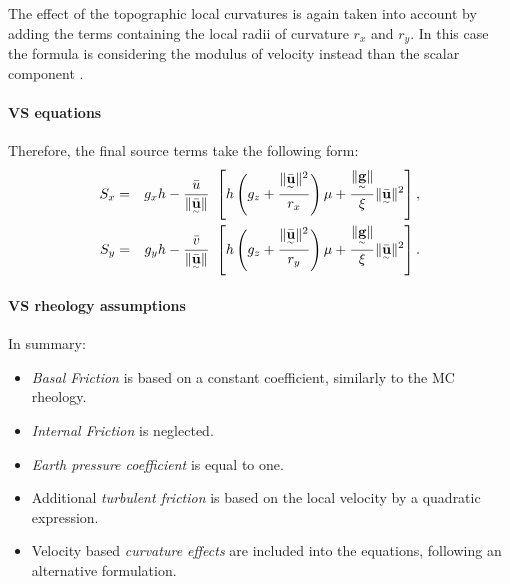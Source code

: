 \documentclass{article}
\begin{document}
The effect of the topographic local curvatures is again taken into account by adding the terms containing the local radii of curvature $r_x$ and $r_y$. In this case the formula is considering the modulus of velocity instead than the scalar component \citep{Fischer2012}.

\paragraph{VS equations} Therefore, the final source terms take the following form:
\begin{eqnarray}
\label{eq:S_terms_VS}
S_{x} &=&  g_{x} h - \frac{\bar{u}}{\| \underset{^\sim}{\bar{\textbf u}}\|} \ \left[ h \left(g_{z} + \frac{\| \underset{^\sim}{\bar{\textbf u}} \|^2}{r_{x}} \right)\mu+ \frac{\| \underset{^\sim}{\textbf g} \|}{\xi}\| \underset{^\sim}{\bar{\textbf u}} \|^2\right], \nonumber \\
S_{y} &=& g_{y} h - \frac{\bar{v}}{\| \underset{^\sim}{\bar{\textbf u}}\|} \ \left[ h \left(g_{z} + \frac{\| \underset{^\sim}{\bar{\textbf u}} \|^2}{r_{y}} \right)\mu+ \frac{\| \underset{^\sim}{\textbf g} \|}{\xi}\| \underset{^\sim}{\bar{\textbf u}} \|^2\right].
\end{eqnarray}

\paragraph{VS rheology assumptions} In summary:
\begin{itemize}
\item \textit{Basal Friction} is based on a constant coefficient, similarly to the MC rheology.

\item \textit{Internal Friction} is neglected.

\item \textit{Earth pressure coefficient} is equal to one.

\item Additional \textit{turbulent friction} is based on the local velocity by a quadratic expression.

\item Velocity based \textit{curvature effects} are included into the equations, following an alternative formulation.
\end{itemize}
\end{document}
